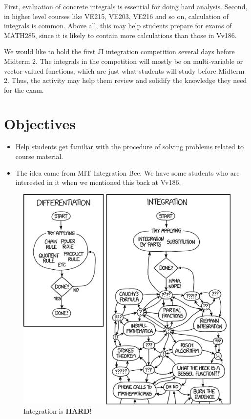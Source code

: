 \documentclass[12pt]{article}
\begin{document}
\par First, evaluation of concrete integrals is essential for doing hard analysis. Second, in higher level courses like VE215, VE203, VE216 and so on, calculation of integrals is 
common. Above all, this may help students prepare for exams of MATH285, since it is likely to contain more calculations than those in Vv186.

\par We would like to hold the first JI integration competition several days before Midterm 2. The integrals in the competition will mostly be on multi-variable or 
vector-valued functions, which are just what students will study before Midterm 2. Thus, the activity may help them review and solidify the knowledge they need for 
the exam.

\section{Objectives}
\begin{itemize}
    \item Help students get familiar with the procedure of solving problems related to course material.
    \item The idea came from MIT Integration Bee.  We have some students who are interested in it when we mentioned this back at Vv186.
\end{itemize}

\begin{figure}[H]
	\centering
	\includegraphics[width=0.7\linewidth]{Figure/pic1.png}
    \caption*{Integration is \textbf{HARD}!\protect\footnotemark}
\end{figure}
\end{document}
